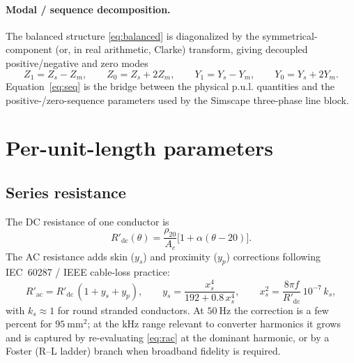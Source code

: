\documentclass[11pt,a4paper,oneside]{book}
\begin{document}
\begin{onehalfspace}
\begin{appendices}
\paragraph{Modal / sequence decomposition.}
The balanced structure \eqref{eq:balanced} is diagonalized by the symmetrical-component
(or, in real arithmetic, Clarke) transform, giving decoupled positive/negative
and zero modes
\begin{equation}
	Z_1=Z_s-Z_m,\qquad Z_0=Z_s+2Z_m,
	\qquad
	Y_1=Y_s-Y_m,\qquad Y_0=Y_s+2Y_m .
	\label{eq:seq}
\end{equation}
Equation~\eqref{eq:seq} is the bridge between the physical p.u.l. quantities and
the positive-/zero-sequence parameters used by the Simscape three-phase line
block.

\section{Per-unit-length parameters}\label{sec:pul}

\subsection{Series resistance}
The DC resistance of one conductor is
\begin{equation}
	R'_{\mathrm{dc}}(\theta)=\frac{\rho_{20}}{A_c}\bigl[1+\alpha(\theta-20)\bigr].
	\label{eq:rdc}
\end{equation}
The AC resistance adds skin ($y_s$) and proximity ($y_p$) corrections following
IEC~60287 / IEEE cable-loss practice:
\begin{equation}
	R'_{\mathrm{ac}}=R'_{\mathrm{dc}}\,(1+y_s+y_p),
	\qquad
	y_s=\frac{x_s^4}{192+0.8\,x_s^4},
	\qquad
	x_s^2=\frac{8\pi f}{R'_{\mathrm{dc}}}\,10^{-7}\,k_s,
	\label{eq:rac}
\end{equation}
with $k_s\approx1$ for round stranded conductors. At $50\ \mathrm{Hz}$ the
correction is a few percent for $95\ \mathrm{mm^2}$; at the kHz range relevant to
converter harmonics it grows and is captured by re-evaluating \eqref{eq:rac} at the
dominant harmonic, or by a Foster (R--L ladder) branch when broadband fidelity is
required.


\end{appendices}
\end{onehalfspace}
\end{document}
